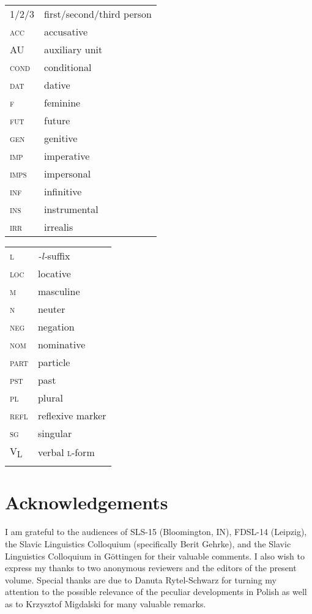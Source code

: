 \documentclass[output=paper]{langscibook}
\begin{document}
\begin{tabularx}{.5\textwidth}{@{}lX@{}}
\textsc{1/2/3}&first/second/third person\\
\textsc{acc}&accusative\\
\textsc{AU}&auxiliary unit\\
\textsc{cond}&conditional\\
\textsc{dat}&dative\\
\textsc{f}&feminine\\
\textsc{fut}&future\\
\textsc{gen}&genitive\\
\textsc{imp}&imperative\\
\textsc{imps}&impersonal\\
\textsc{inf}&infinitive\\
\textsc{ins}&instrumental\\
\textsc{irr}&irrealis\\
\end{tabularx}%
\begin{tabularx}{.5\textwidth}{@{}lX@{}}
\textsc{l}&\textit{-l-}suffix\\
\textsc{loc}&locative\\
\textsc{m}&masculine\\
\textsc{n}&neuter\\
\textsc{neg}&negation\\
\textsc{nom}&nominative\\
\textsc{part}&particle\\
\textsc{pst}&past\\
\textsc{pl}&plural\\
\textsc{refl}&reflexive marker\\
\textsc{sg}&singular\\
\textsc{V\textsubscript{L}}&verbal \textsc{l-}form\\
&\\
\end{tabularx}


\section*{Acknowledgements}
I am grateful to the audiences of SLS-15 (Bloomington, IN), FDSL-14 (Leipzig), the Slavic Linguistics Colloquium (specifically Berit Gehrke), and the Slavic Linguistics Colloquium in Göttingen for their valuable comments. I also wish to express my thanks to two anonymous reviewers and the editors of the present volume. Special thanks are due to Danuta Rytel-Schwarz for turning my attention to the possible relevance of the peculiar developments in Polish as well as to Krzysztof Migdalski for many valuable remarks.


\printbibliography[heading=subbibliography,notkeyword=this]
\end{document}
